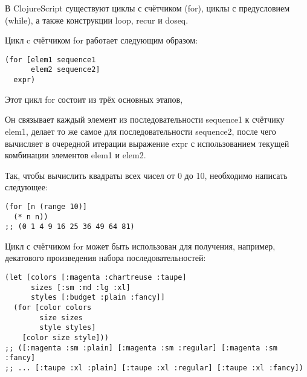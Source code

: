 В ClojureScript существуют циклы с счётчиком (for), циклы с предусловием (while), а также конструкции loop, recur и doseq.

Цикл c счётчиком for работает следующим образом:

\begin{center}
	\captionsetup{justification=raggedright,singlelinecheck=off}
	\begin{lstlisting}[label=lst:for-usage,caption=Синтаксис использования for для 2-х последовательностей]
(for [elem1 sequence1                                    
      elem2 sequence2]                                   
  expr)
	\end{lstlisting}
\end{center}

Этот цикл  for состоит из трёх основных этапов, 

Он связывает каждый элемент из последовательности sequence1 к  счётчику elem1, делает то же самое для последовательности sequence2,  после чего вычисляет в очередной итерации выражение expr с использованием текущей комбинации элементов elem1 и elem2.

Так, чтобы вычислить квадраты всех чисел от 0 до 10, необходимо написать следующее:


\begin{center}
	\captionsetup{justification=raggedright,singlelinecheck=off}
	\begin{lstlisting}[label=lst:for-example-1,caption=Пример использования for для одной последовательности]
(for [n (range 10)]                                        
  (* n n))                                                
;; (0 1 4 9 16 25 36 49 64 81)
	\end{lstlisting}
\end{center}

Цикл с счётчиком for может быть использован для получения, например, декатового произведения набора последовательностей:

\begin{center}
	\captionsetup{justification=raggedright,singlelinecheck=off}
	\begin{lstlisting}[label=lst:for-example-2,caption=Пример использования for для трёх последовательностей]
(let [colors [:magenta :chartreuse :taupe]                 
      sizes [:sm :md :lg :xl]
      styles [:budget :plain :fancy]]
  (for [color colors                                       
        size sizes
        style styles]
    [color size style]))                                   
;; ([:magenta :sm :plain] [:magenta :sm :regular] [:magenta :sm :fancy]
;; ... [:taupe :xl :plain] [:taupe :xl :regular] [:taupe :xl :fancy])
	\end{lstlisting}
\end{center}

